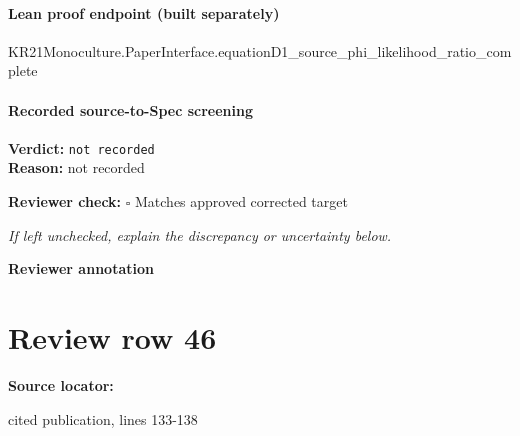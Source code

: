 \documentclass[10pt]{article}
\newcommand{\reviewerbox}{%
  \par\noindent\fbox{\parbox{0.96\linewidth}{\rule{0pt}{0.38in}}}\par
}
\newcommand{\reviewmatch}[1]{%
  \par\noindent\textbf{Reviewer check:} $\square$\; #1\par
  \noindent\emph{If left unchecked, explain the discrepancy or uncertainty below.}\par
}
\begin{document}
\paragraph{Lean proof endpoint (built separately)}\begin{ReviewVerbatim}
KR21Monoculture.PaperInterface.equationD1_source_phi_likelihood_ratio_complete
\end{ReviewVerbatim}

\paragraph{Recorded source-to-Spec screening}
\textbf{Verdict:} \texttt{not recorded}
\\
\textbf{Reason:} not recorded
\reviewmatch{Matches approved corrected target}
\noindent\textbf{Reviewer annotation}\par
\reviewerbox
\clearpage
\hypertarget{source-claim-c7560a9682e8906d}{}
\section*{Review row 46}
\textbf{Source locator:} {\footnotesize\raggedright cited publication, lines 133-\allowbreak{}138\par}
\end{document}
